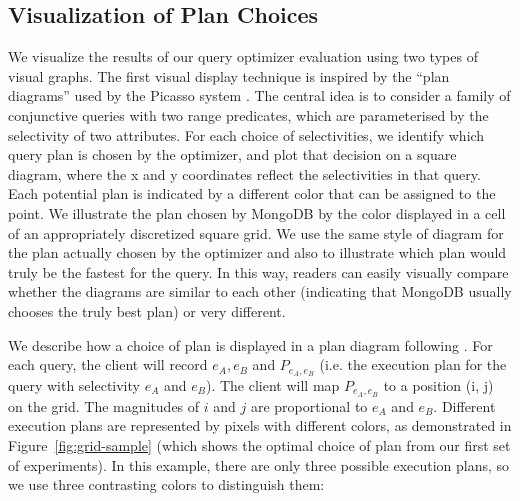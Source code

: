 \subsection{Visualization of Plan Choices} \label{sec:vm}
We visualize the results of our query optimizer evaluation using two types of visual graphs. The first visual display technique is inspired by the ``plan diagrams'' used by the Picasso system \cite{reddy2005analyzing}. The central idea is to consider a family of conjunctive queries with two range predicates, which are parameterised by the selectivity of two attributes. For each choice of selectivities, we identify which query plan is chosen by the optimizer, and plot that decision on a square diagram, where the x and y coordinates reflect the selectivities in that query. Each potential plan is indicated by a different color that can be assigned to the point. %
We illustrate the plan chosen by MongoDB by the color displayed in a cell of an appropriately discretized square grid.  We use the same style of diagram for the plan actually chosen by the optimizer and also to illustrate which plan would truly be the fastest for the query. In this way, readers can easily visually compare whether the diagrams are similar to each other (indicating that MongoDB usually chooses the truly best plan) or very different.

We describe how a choice of plan is displayed in a plan diagram following \cite{reddy2005analyzing}. For each query, the client will record $e_A, e_B$ and $P_{e_A, e_B}$ (i.e. the execution plan for the query with selectivity $e_A$ and $e_B$). The client will map $P_{e_A, e_B}$ to a position (i, j) on the grid. The magnitudes of $i$ and $j$ are proportional to $e_A$ and $e_B$. Different execution plans are represented by pixels with different colors, as demonstrated in Figure~\ref{fig:grid-sample} (which shows the optimal choice of plan from our first set of experiments). In this example, there are only three possible execution plans, so we use three contrasting colors to distinguish them:

